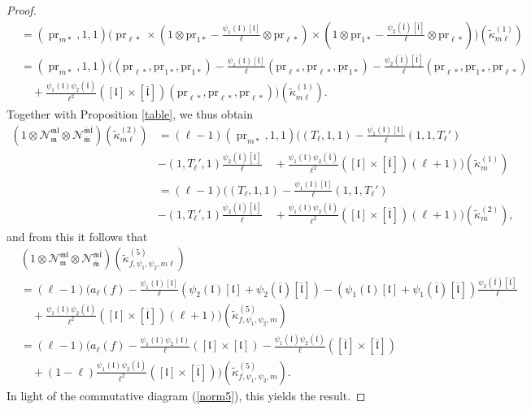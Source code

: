 \documentclass[10pt,letterpaper]{amsart}
\theoremstyle{plain}
\theoremstyle{definition}
\theoremstyle{definition}
\theoremstyle{plain}
\theoremstyle{plain}
\theoremstyle{plain}
\theoremstyle{remark}
\numberwithin{equation}{section}
\newcommand{\fkm}{\mathfrak{m}}
\newcommand{\fkmbar}{\overline{\mathfrak{m}}}
\newcommand{\fkl}{\mathfrak{l}}
\newcommand{\fklbar}{\overline{\mathfrak{l}}}
\DeclareMathOperator{\tpr}{\text{pr}}
\begin{document}
\begin{proof}
\begin{align*}
&=(\tpr_{m*},1,1)\biggl(\tpr_{\ell*}\times(1\otimes \text{pr}_{1*}-\frac{\psi_1(\fkl)[\fkl]}{\ell}\otimes \text{pr}_{\ell*})\times(1\otimes \text{pr}_{1*}-\frac{\psi_2(\bar{\mathfrak{l}})[\bar{\mathfrak{l}}]}{\ell}\otimes \text{pr}_{\ell*})\biggr)(\tilde{\kappa}^{(1)}_{m\ell})\\
&=(\tpr_{m*},1,1)\biggl((\text{pr}_{\ell*},{\mathrm{pr}}_{1*},{\mathrm{pr}}_{1*})-\frac{\psi_1(\fkl)[\fkl]}{\ell}(\text{pr}_{\ell*},\text{pr}_{\ell*},{\mathrm{pr}}_{1*})-\frac{\psi_2(\fklbar)[\fklbar]}{\ell}(\text{pr}_{\ell*},{\mathrm{pr}}_{1*},\text{pr}_{\ell*})\\
&\quad+\frac{\psi_1(\fkl)\psi_2(\fklbar)}{\ell^2}([\fkl]\times[\fklbar])(\text{pr}_{\ell*},\text{pr}_{\ell*},\text{pr}_{\ell*})\biggr)(\tilde{\kappa}^{(1)}_{m\ell}).
\end{align*}
Together with Proposition \ref{table}, we thus obtain
\begin{align*}
(1\otimes\mathcal{N}_{\fkm}^{\mathfrak{ml}}\otimes\mathcal{N}_{\fkmbar}^{\fkmbar\fklbar})(\tilde{\kappa}^{(2)}_{m\ell})
&=(\ell-1)(\tpr_{m*},1,1)\bigg((T_\ell,1,1)-\frac{\psi_1(\fkl)[\fkl]}{\ell}(1,1,T_\ell') \\ &-(1,T_\ell',1)\frac{\psi_2(\fklbar)[\fklbar]}{\ell}\quad+\frac{\psi_1(\fkl)\psi_2(\fklbar)}{\ell^2}([\fkl]\times[\fklbar])(\ell+1)\bigg)(\tilde{\kappa}^{(1)}_{m})\\
&=(\ell-1)\bigg((T_\ell,1,1)-\frac{\psi_1(\fkl)[\fkl]}{\ell}(1,1,T_\ell')\\ &-(1,T_\ell',1)\frac{\psi_2(\fklbar)[\fklbar]}{\ell}\quad+\frac{\psi_1(\fkl)\psi_2(\fklbar)}{\ell^2}([\fkl]\times[\fklbar])(\ell+1)\bigg)(\tilde{\kappa}^{(2)}_{m}),
\end{align*}
and from this it follows that
\begin{align*}
&(1\otimes\mathcal{N}_{\fkm}^{\mathfrak{ml}}\otimes\mathcal{N}_{\fkmbar}^{\fkmbar\fklbar})(\tilde{\kappa}^{(5)}_{f,\psi_1,\psi_2,m\ell})\\
     &=(\ell-1)\bigg(a_\ell(f)-\frac{\psi_1(\fkl)[\fkl]}{\ell}(\psi_2(\fkl)[\fkl]+\psi_2(\fklbar)[\fklbar])-(\psi_1(\fkl)[\fkl]+\psi_1(\fklbar)[\fklbar])\frac{\psi_2(\fklbar)[\fklbar]}{\ell}\\
     &\quad+\frac{\psi_1(\fkl)\psi_2(\fklbar)}{\ell^2}([\fkl]\times[\fklbar])(\ell+1)\bigg)(\tilde{\kappa}^{(5)}_{f,\psi_1,\psi_2,m})\\
     &=(\ell-1)\bigg(a_\ell(f)-\frac{\psi_1(\fkl)\psi_2(\fkl)}{\ell}([\fkl]\times [\fkl])-\frac{\psi_1(\fklbar)\psi_2(\fklbar)}{\ell}([\fklbar]\times [\fklbar])\\
     &\quad+(1-\ell)\frac{\psi_1(\fkl)\psi_2(\fklbar)}{\ell^2}([\fkl]\times[\fklbar])\bigg)(\tilde{\kappa}^{(5)}_{f,\psi_1,\psi_2,m}).
\end{align*} 
In light of the commutative diagram (\ref{norm5}), this yields the result.
\end{proof}
\end{document}
